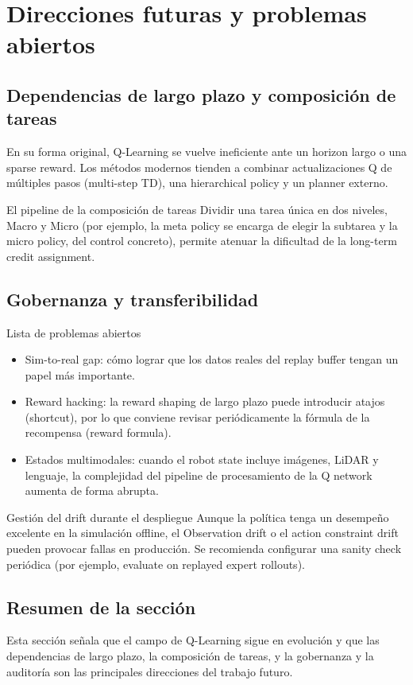 \section{Direcciones futuras y problemas abiertos}

\subsection{Dependencias de largo plazo y composición de tareas}

En su forma original, Q-Learning se vuelve ineficiente ante un horizon largo o una sparse reward. Los métodos modernos tienden a combinar actualizaciones Q de múltiples pasos (multi-step TD), una hierarchical policy y un planner externo.

\begin{importantbox}{El pipeline de la composición de tareas}
Dividir una tarea única en dos niveles, Macro y Micro (por ejemplo, la meta policy se encarga de elegir la subtarea y la micro policy, del control concreto), permite atenuar la dificultad de la long-term credit assignment.
\end{importantbox}

\subsection{Gobernanza y transferibilidad}

\begin{knowledgebox}{Lista de problemas abiertos}
\begin{itemize}
    \item Sim-to-real gap: cómo lograr que los datos reales del replay buffer tengan un papel más importante.
    \item Reward hacking: la reward shaping de largo plazo puede introducir atajos (shortcut), por lo que conviene revisar periódicamente la fórmula de la recompensa (reward formula).
    \item Estados multimodales: cuando el robot state incluye imágenes, LiDAR y lenguaje, la complejidad del pipeline de procesamiento de la Q network aumenta de forma abrupta.
\end{itemize}
\end{knowledgebox}

\begin{warningbox}{Gestión del drift durante el despliegue}
Aunque la política tenga un desempeño excelente en la simulación offline, el Observation drift o el action constraint drift pueden provocar fallas en producción. Se recomienda configurar una sanity check periódica (por ejemplo, evaluate on replayed expert rollouts).
\end{warningbox}

\subsection{Resumen de la sección}

Esta sección señala que el campo de Q-Learning sigue en evolución y que las dependencias de largo plazo, la composición de tareas, y la gobernanza y la auditoría son las principales direcciones del trabajo futuro.
